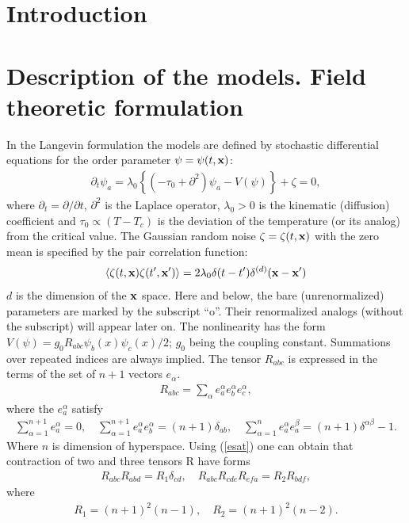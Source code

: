 \documentclass[12pt]{article}
\begin{document}
\section{Introduction} \label{sec:Intro}



\section{Description of the models. Field theoretic formulation}
\label{sec:QFT}

In the Langevin formulation the models are defined by stochastic
differential equations for the order parameter
$\psi = \psi(t,{\bf x})$:
\begin{eqnarray}
\partial_{t} \psi_{a} = \lambda_{0} \left\{ (-\tau_{0} +
\partial^{2}) \psi_{a} - V(\psi) \right\} + \zeta  = 0,
\label{stoh}
\end{eqnarray}
where $\partial_{t}= \partial/ \partial t$, $\partial^{2}$ is the
Laplace operator, $\lambda_{0}>0$ is the kinematic (diffusion)
coefficient and $\tau_{0} \propto (T-T_{c})$ is the deviation of
the temperature (or its analog) from the critical value.
 The Gaussian random noise
$\zeta=\zeta(t,{\bf x})$ with the zero mean is specified by the
pair correlation function:
\begin{eqnarray}
\langle \zeta (t,{\bf x})\zeta (t',{\bf x'}) \rangle =
2 \lambda_{0}  \delta(t-t')\delta^{(d)}({\bf x}-{\bf x}')
\label{kor1}
\end{eqnarray}
 $d$ is the dimension of the ${\bf x}$ space.  Here and below, the bare (unrenormalized) parameters are
marked by the subscript ``o''. Their renormalized analogs (without
the subscript) will appear later on.  The
nonlinearity has the form $V(\psi)=g_{0}R_{abc} \psi_{b}(x)\psi_{c}(x)/2$; $g_{0}$
 being the coupling constant. Summations over repeated indices are always implied.
The tensor $R_{abc}$ is expressed in the terms of the set of $n+1$ vectors $e_{\alpha}$.
\begin{eqnarray}
R_{abc}=\sum\limits_{\alpha}e^{\alpha}_{a}e^{\alpha}_{b}e^{\alpha}_{c},
\label{Rofe}
\end{eqnarray}
where the $e_{a}^{\alpha}$ satisfy
\begin{eqnarray}
\sum\limits_{\alpha=1}^{n+1}e^{\alpha}_{a}=0,\quad \sum\limits_{\alpha=1}^{n+1}e^{\alpha}_{a}e^{\alpha}_{b}=(n+1)\delta_{ab},\quad \sum\limits_{\alpha=1}^{n}e_{a}^{\alpha}e_{a}^{\beta}=(n+1)\delta^{\alpha\beta}-1.
\label{esat}
\end{eqnarray}
Where $n$ is dimension of hyperspace. Using (\ref{esat}) one can obtain that contraction of two and three tensors R have forms
\begin{eqnarray}
R_{abc}R_{abd}=R_1\delta_{cd}, \quad R_{abc}R_{cde}R_{efa}=R_2 R_{bdf},
\label{rcont}
\end{eqnarray}
where
\begin{eqnarray}
R_1=(n+1)^2(n-1),\quad R_2=(n+1)^2(n-2).
\label{r1r2}
\end{eqnarray}
\end{document}
